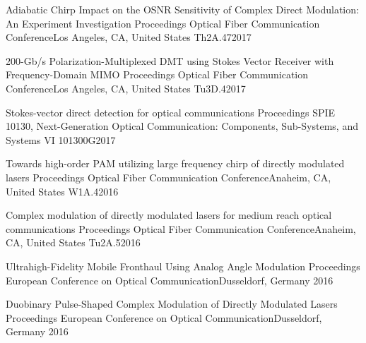 \begin{cvpubs}[fontsize=12pt, series=papers]
    {Adiabatic Chirp Impact on the OSNR Sensitivity of Complex Direct Modulation: An Experiment Investigation}%
    {Proceedings Optical Fiber Communication Conference}{Los Angeles, CA, United States}{}%
    {Th2A.47}{}{2017}

    {200-Gb/s Polarization-Multiplexed DMT using Stokes Vector Receiver with Frequency-Domain MIMO}%
    {Proceedings Optical Fiber Communication Conference}{Los Angeles, CA, United States}{}%
    {Tu3D.4}{}{2017}

    {Stokes-vector direct detection for optical communications}%
    {Proceedings SPIE 10130, Next-Generation Optical Communication: Components, Sub-Systems, and Systems VI}{}{}%
    {101300G}{}{2017}

    {Towards high-order PAM utilizing large frequency chirp of directly modulated lasers}%
    {Proceedings Optical Fiber Communication Conference}{Anaheim, CA, United States}{}%
    {W1A.4}{}{2016}

    {Complex modulation of directly modulated lasers for medium reach optical communications}%
    {Proceedings Optical Fiber Communication Conference}{Anaheim, CA, United States}{}%
    {Tu2A.5}{}{2016}

    {Ultrahigh-Fidelity Mobile Fronthaul Using Analog Angle Modulation}%
    {Proceedings European Conference on Optical Communication}{Dusseldorf, Germany}{}%
    {}{}{2016}

    {Duobinary Pulse-Shaped Complex Modulation of Directly Modulated Lasers}%
    {Proceedings European Conference on Optical Communication}{Dusseldorf, Germany}{}%
    {}{}{2016}


\end{cvpubs}
